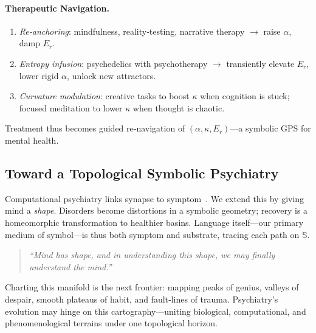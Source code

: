 \paragraph{Therapeutic Navigation.}
\begin{enumerate}
    \item \textit{Re‑anchoring}: mindfulness, reality‑testing, narrative therapy $\rightarrow$ raise $\alpha$, damp $E_r$.
    \item \textit{Entropy infusion}: psychedelics with psychotherapy $\rightarrow$ transiently elevate $E_r$, lower rigid $\alpha$, unlock new attractors.
    \item \textit{Curvature modulation}: creative tasks to boost $\kappa$ when cognition is stuck; focused meditation to lower $\kappa$ when thought is chaotic.
\end{enumerate}
Treatment thus becomes guided re‑navigation of $(\alpha,\kappa,E_r)$—a symbolic GPS for mental health.

\subsection*{Toward a Topological Symbolic Psychiatry}

Computational psychiatry links synapse to symptom \cite{friston2023compnos}. We extend this by giving mind a \emph{shape}. Disorders become distortions in a symbolic geometry; recovery is a homeomorphic transformation to healthier basins. Language itself—our primary medium of symbol—is thus both symptom and substrate, tracing each path on $\mathbb{S}$.

\begin{quote}
\textit{“Mind has shape, and in understanding this shape, we may finally understand the mind.”}
\end{quote}

Charting this manifold is the next frontier: mapping peaks of genius, valleys of despair, smooth plateaus of habit, and fault‑lines of trauma. Psychiatry’s evolution may hinge on this cartography—uniting biological, computational, and phenomenological terrains under one topological horizon.



